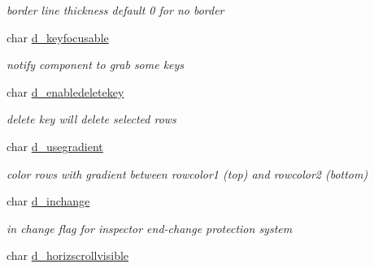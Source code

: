 \begin{DoxyCompactItemize}
\begin{DoxyCompactList}\small\item\em border line thickness default 0 for no border \item\end{DoxyCompactList}\item 
\hypertarget{structt__jdataview_aa81c10c657db014e59a3391f15268822}{
char \hyperlink{structt__jdataview_aa81c10c657db014e59a3391f15268822}{d\_\-keyfocusable}}
\label{structt__jdataview_aa81c10c657db014e59a3391f15268822}

\begin{DoxyCompactList}\small\item\em notify component to grab some keys \item\end{DoxyCompactList}\item 
\hypertarget{structt__jdataview_a0be64b74eee9e57caa7c2d256bc2f3b9}{
char \hyperlink{structt__jdataview_a0be64b74eee9e57caa7c2d256bc2f3b9}{d\_\-enabledeletekey}}
\label{structt__jdataview_a0be64b74eee9e57caa7c2d256bc2f3b9}

\begin{DoxyCompactList}\small\item\em delete key will delete selected rows \item\end{DoxyCompactList}\item 
\hypertarget{structt__jdataview_a7eb84beda7ac285a975c7a01c6c3e6b4}{
char \hyperlink{structt__jdataview_a7eb84beda7ac285a975c7a01c6c3e6b4}{d\_\-usegradient}}
\label{structt__jdataview_a7eb84beda7ac285a975c7a01c6c3e6b4}

\begin{DoxyCompactList}\small\item\em color rows with gradient between rowcolor1 (top) and rowcolor2 (bottom) \item\end{DoxyCompactList}\item 
\hypertarget{structt__jdataview_a37775d1ed1183eff412fb411dde62ee9}{
char \hyperlink{structt__jdataview_a37775d1ed1183eff412fb411dde62ee9}{d\_\-inchange}}
\label{structt__jdataview_a37775d1ed1183eff412fb411dde62ee9}

\begin{DoxyCompactList}\small\item\em in change flag for inspector end-\/change protection system \item\end{DoxyCompactList}\item 
\hypertarget{structt__jdataview_ae1cf57dc8c57d04a4ba60c53e4ff4c0c}{
char \hyperlink{structt__jdataview_ae1cf57dc8c57d04a4ba60c53e4ff4c0c}{d\_\-horizscrollvisible}}
\label{structt__jdataview_ae1cf57dc8c57d04a4ba60c53e4ff4c0c}


\end{DoxyCompactItemize}
